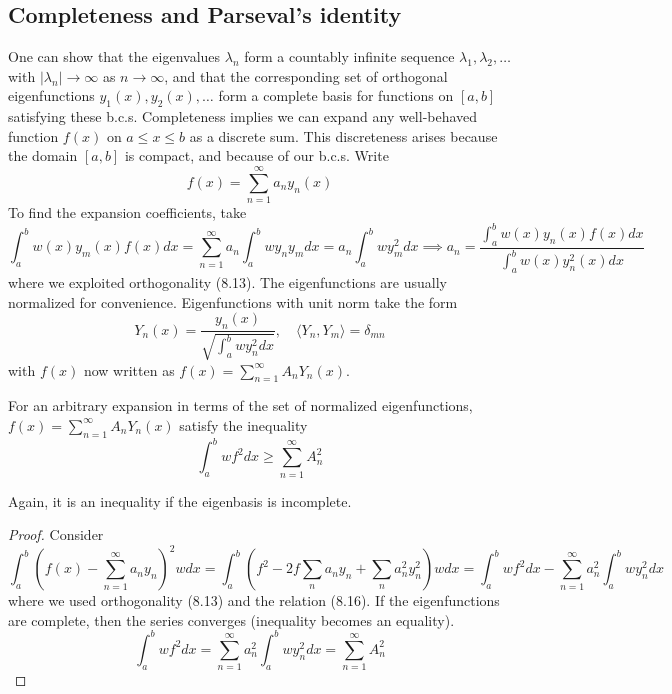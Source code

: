 \documentclass[a4paper]{article}
\begin{document}
\subsection{Completeness and Parseval's identity}
One can show that the eigenvalues $\lambda_n$ form a countably infinite sequence $\lambda_1,\lambda_2,\dots$ with $|\lambda_n|\rightarrow\infty$ as $n\rightarrow\infty$, and that the corresponding set of orthogonal eigenfunctions $y_1(x),y_2(x),\dots$ form a complete basis for functions on $[a,b]$ satisfying these b.c.s. Completeness implies we can expand any well-behaved function $f(x)$ on $a\leq x\leq b$ as a discrete sum. This discreteness arises because the domain $[a,b]$ is compact, and because of our b.c.s. Write
\begin{equation}
    f(x)=\sum_{n=1}^\infty a_ny_n(x)\tag{8.14}
\end{equation}
To find the expansion coefficients, take
\begin{equation}
   \int_a^bw(x)y_m(x)f(x)dx=\sum_{n=1}^\infty a_n\int_a^bwy_ny_mdx=a_n\int_a^bwy_m^2dx\implies a_n=\frac{\int_a^bw(x)y_n(x)f(x)dx}{\int_a^bw(x)y_n^2(x)dx}\tag{8.15} 
\end{equation}
where we exploited orthogonality (8.13). The eigenfunctions are usually normalized for convenience. Eigenfunctions with unit norm take the form
\begin{equation}
    Y_n(x)=\frac{y_n(x)}{\sqrt{\int_a^bwy_n^2dx}},\quad\langle Y_n,Y_m\rangle=\delta_{mn}\tag{8.16}
\end{equation}
with $f(x)$ now written as $f(x)=\sum_{n=1}^\infty A_nY_n(x)$. 
\begin{prop}
For an arbitrary expansion in terms of the set of normalized eigenfunctions, $f(x)=\sum_{n=1}^\infty A_nY_n(x)$ satisfy the inequality
$$\int_a^bwf^2dx\geq\sum_{n=1}^\infty A_n^2$$
\end{prop}
Again, it is an inequality if the eigenbasis is incomplete.
\begin{proof}
Consider
$$\int_a^b(f(x)-\sum_{n=1}^\infty a_ny_n)^2wdx=\int_a^b(f^2-2f\sum_na_ny_n+\sum_na_n^2y_n^2)wdx=\int_a^bwf^2dx-\sum_{n=1}^\infty a_n^2\int_a^bwy_n^2dx$$
where we used orthogonality (8.13) and the relation (8.16). If the eigenfunctions are complete, then the series converges (inequality becomes an equality).
\begin{equation}
    \int_a^bwf^2dx=\sum_{n=1}^\infty a_n^2\int_a^bwy_n^2dx=\sum_{n=1}^\infty A_n^2\tag{8.17}
\end{equation}
\end{proof}
\end{document}
